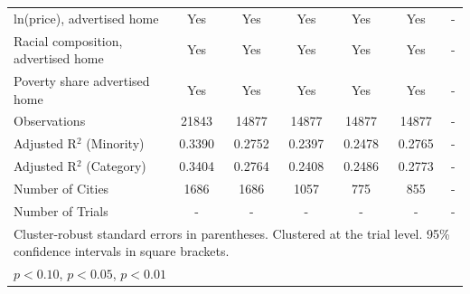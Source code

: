 \begin{table}[htbp]
{\begin{tabular}{l*{6}{c}}
ln(price), advertised home  & Yes & Yes & Yes & Yes & Yes & - \\
Racial composition, advertised home & Yes & Yes & Yes & Yes & Yes & - \\
Poverty share advertised home & Yes & Yes & Yes & Yes & Yes & - \\
Observations & 21843 & 14877 & 14877 & 14877 & 14877 & - \\
Adjusted R$^2$ (Minority) & 0.3390 & 0.2752 & 0.2397 & 0.2478 & 0.2765 & - \\
Adjusted R$^2$ (Category) & 0.3404 & 0.2764 & 0.2408 & 0.2486 & 0.2773 & - \\
Number of Cities & 1686 & 1686 & 1057 & 775 & 855 & - \\
Number of Trials & - & - & - & - & - & - \\
\bottomrule
\multicolumn{7}{l}{\footnotesize Cluster-robust standard errors in parentheses. Clustered at the trial level. 95\% confidence intervals in square brackets.}\\
\multicolumn{7}{l}{\footnotesize \sym{*} \(p<0.10\), \sym{**} \(p<0.05\), \sym{***} \(p<0.01\)}\\
\end{tabular}
}
\end{table}
